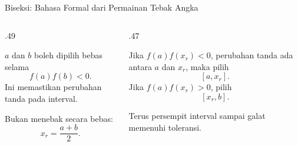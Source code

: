 \documentclass[aspectratio=169,10pt]{beamer}
\begin{document}
\begin{frame}{Biseksi: Bahasa Formal dari Permainan Tebak Angka}
\scriptsize
\begin{columns}[T,totalwidth=\textwidth]
\begin{column}{.49\textwidth}
\begin{bluebox}
\(a\) dan \(b\) boleh dipilih bebas selama
\[
f(a)f(b)<0.
\]
Ini memastikan perubahan tanda pada interval.
\end{bluebox}
\begin{orangebox}
Bukan menebak secara bebas:
\[
x_r=\frac{a+b}{2}.
\]
\end{orangebox}
\end{column}
\begin{column}{.47\textwidth}
\begin{greenbox}
Jika \(f(a)f(x_r)<0\), perubahan tanda ada antara \(a\) dan \(x_r\), maka pilih
\[
[a,x_r].
\]
Jika \(f(a)f(x_r)>0\), pilih
\[
[x_r,b].
\]
\end{greenbox}
\begin{goldbox}[4. Ulangi]
Terus persempit interval sampai galat memenuhi toleransi.
\end{goldbox}
\end{column}
\end{columns}
\end{frame}
\end{document}
